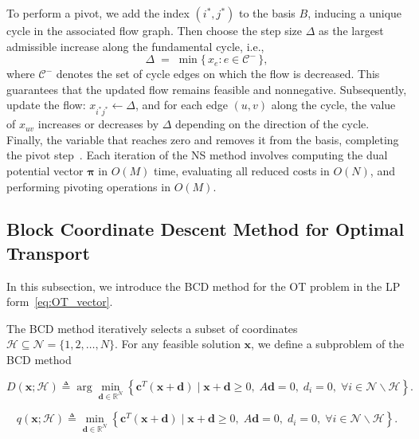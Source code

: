 \documentclass[12pt,a4paper]{article}
\begin{document}
To perform a pivot, we add the index \( (i^*, j^*) \) to the basis \( B \), inducing a unique cycle in the associated flow graph. 
Then choose the step size $\Delta$ as the largest admissible increase along the fundamental cycle, i.e.,
\[
\Delta \;=\; \min\{\, x_e : e \in \mathcal{C}^- \,\},
\]
where $\mathcal{C}^-$ denotes the set of cycle edges on which the flow is decreased. This guarantees that the updated flow remains feasible and nonnegative.
Subsequently, update the flow: \( x_{i^* j^*} \gets \Delta \), and for each edge \( (u,v) \) along the cycle, the value of \( x_{uv} \) increases or decreases by \( \Delta \) depending on the direction of the cycle. Finally, the variable that reaches zero and removes it from the basis, completing the pivot step~\cite{vanderbei2001linear}.
Each iteration of the NS method involves computing the dual potential vector \( \boldsymbol{\pi} \) in \( O(M) \) time, evaluating all reduced costs in \( O(N) \), and performing pivoting operations in \( O(M) \).






\subsection{Block Coordinate Descent Method for Optimal Transport}

In this subsection, we introduce the BCD method for the OT problem in the LP form~\eqref{eq:OT_vector}.

The BCD method iteratively selects a subset of coordinates \(\mathcal{H} \subseteq \mathcal{N} = \{1, 2, \dots, N\}\). For any feasible solution \( \mathbf{x} \), we define a subproblem of the BCD method

\begin{equation}
D(\mathbf{x} ; \mathcal{H}) \triangleq \arg\min _{\mathbf{d} \in \mathbb{R}^N}\left\{\mathbf{c}^T (\mathbf{x} + \mathbf{d}) \mid \mathbf{x}+\mathbf{d} \geq 0, \;A \mathbf{d}=0,\; d_i=0,\; \forall i \in \mathcal{N} \backslash \mathcal{H}\right\}.
\label{eq:DxH}
\end{equation}

\begin{equation}
q(\mathbf{x} ; \mathcal{H}) \triangleq \min _{\mathbf{d} \in \mathbb{R}^N}\left\{\mathbf{c}^T (\mathbf{x} + \mathbf{d}) \mid \mathbf{x}+\mathbf{d} \geq 0, \;A \mathbf{d}=0,\; d_i=0,\; \forall i \in \mathcal{N} \backslash \mathcal{H}\right\}.
\label{eq:qH}
\end{equation}
\end{document}
